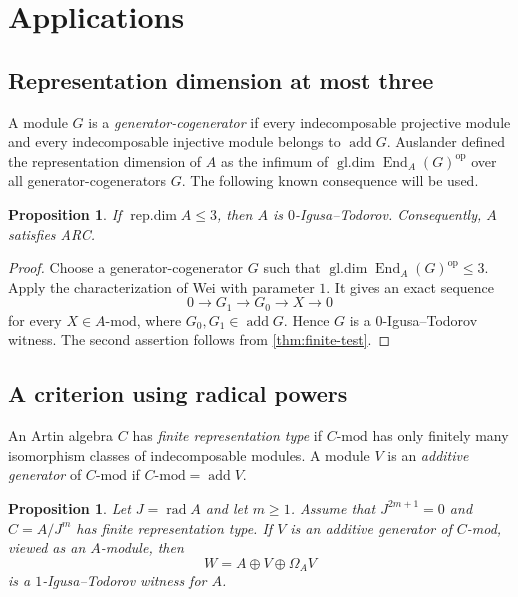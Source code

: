 \documentclass[a4paper,reqno]{amsart}
\numberwithin{equation}{section}
\newtheorem{prop}[thm]{Proposition}
\theoremstyle{definition}
\DeclareMathOperator{\End}{End}
\DeclareMathOperator{\add}{add}
\DeclareMathOperator{\rad}{rad}
\DeclareMathOperator{\gldim}{gl.dim}
\DeclareMathOperator{\repdim}{rep.dim}
\newcommand{\modA}{A\text{-}\mathrm{mod}}
\begin{document}
\section{Applications}\label{sec:applications}

\subsection{Representation dimension at most three}

A module $G$ is a \emph{generator-cogenerator} if every indecomposable projective module and every indecomposable injective module belongs to $\add G$. Auslander \cite{Auslander1971} defined the representation dimension of $A$ as the infimum of $\gldim\End_A(G)^{\mathrm{op}}$ over all generator-cogenerators $G$. The following known consequence will be used.

\begin{prop}\label{prop:repdim}
If $\repdim A\leq3$, then $A$ is $0$-Igusa--Todorov. Consequently, $A$ satisfies ARC.
\end{prop}

\begin{proof}
Choose a generator-cogenerator $G$ such that $\gldim\End_A(G)^{\mathrm{op}}\leq3$. Apply the characterization of Wei \cite[Lemma~2.1]{Wei2008} with parameter $1$. It gives an exact sequence
\[
0\longrightarrow G_1\longrightarrow G_0\longrightarrow X\longrightarrow0
\]
for every $X\in\modA$, where $G_0,G_1\in\add G$. Hence $G$ is a $0$-Igusa--Todorov witness. The second assertion follows from \cref{thm:finite-test}.
\end{proof}

\subsection{\texorpdfstring{A criterion using radical powers}{A criterion using radical powers}}

An Artin algebra $C$ has \emph{finite representation type} if $C\text{-}\mathrm{mod}$ has only finitely many isomorphism classes of indecomposable modules. A module $V$ is an \emph{additive generator} of $C\text{-}\mathrm{mod}$ if $C\text{-}\mathrm{mod}=\add V$.

\begin{prop}\label{prop:radical-IT}
Let $J=\rad A$ and let $m\geq1$. Assume that $J^{2m+1}=0$ and $C=A/J^m$ has finite representation type. If $V$ is an additive generator of $C$-\textup{mod}, viewed as an $A$-module, then
\[
W=A\oplus V\oplus\Omega_A V
\]
is a $1$-Igusa--Todorov witness for $A$.
\end{prop}
\end{document}
